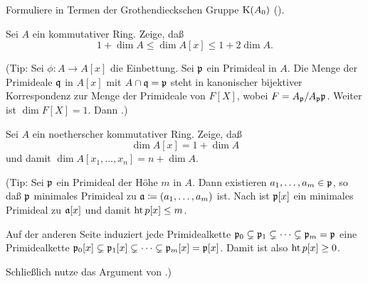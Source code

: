 \begin{exercise}
	Formuliere  in Termen der Grothendieckschen Gruppe \(\operatorname{K}(A_0)\) (). 
\end{exercise}

\begin{exercise}
	\label{exer:poly_dim}
	Sei \(A\) ein kommutativer Ring. Zeige, daß
	\[
		1 + \dim A \le \dim A[x] \le 1 + 2 \dim A.
	\]
	
	(Tip: Sei \(\phi\colon A \to A[x]\) die Einbettung. Sei \(\mathfrak{p}\) ein Primideal in \(A\). Die Menge der Primideale
	\(\mathfrak{q}\) in \(A[x]\) mit \(A \cap \mathfrak{q} = \mathfrak{p}\) steht in kanonischer bijektiver Korrespondenz zur Menge der
	Primideale von \(F[X]\), wobei \(F = A_{\mathfrak{p}}/A_{\mathfrak{p}} \mathfrak{p}\). Weiter ist \(\dim F[X] = 1\). Dann
	.)
\end{exercise}

\begin{exercise}
	Sei \(A\) ein noetherscher kommutativer Ring. Zeige, daß
	\[
		\dim A[x] = 1 + \dim A
	\]
	und damit \(\dim A[x_1, \dotsc, x_n] = n + \dim A\).
	
	(Tip: Sei \(\mathfrak{p}\) ein Primideal der Höhe \(m\) in \(A\). Dann existieren \(a_1, \dotsc, a_m \in \mathfrak{p}\), so daß
	\(\mathfrak{p}\) minimales Primideal zu \(\mathfrak{a} \coloneqq (a_1, \dotsc, a_m)\) ist. Nach 
	ist \(\mathfrak{p}[x]\)	ein minimales Primideal zu \(\mathfrak{a}[x]\) und damit \(\operatorname{ht} p[x] \leq m\).
	
	Auf der anderen Seite induziert jede Primidealkette \(\mathfrak{p}_0 \subsetneq \mathfrak{p}_1 \subsetneq \dotsb \subsetneq
	\mathfrak{p}_m = \mathfrak{p}\) eine Primidealkette \(\mathfrak{p}_0[x] \subsetneq \mathfrak{p}_1[x] \subsetneq \dotsb \subsetneq
	\mathfrak{p}_m[x] = \mathfrak{p}[x]\). Damit ist also \(\operatorname{ht} p[x] \ge 0\).
	
	Schließlich nutze das Argument von .)
\end{exercise}

